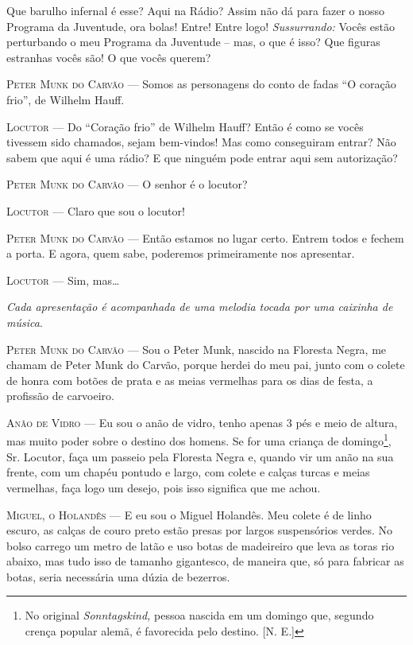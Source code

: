 Que barulho infernal é esse? Aqui na Rádio? Assim não dá para fazer o
nosso Programa da Juventude, ora bolas! Entre! Entre logo!
\emph{Sussurrando:} Vocês estão perturbando o meu Programa da Juventude
-- mas, o que é isso? Que figuras estranhas vocês são! O que vocês
querem?

\textsc{Peter Munk do Carvão} --- Somos as personagens do conto de fadas ``O
coração frio'', de Wilhelm Hauff.

\textsc{Locutor} --- Do ``Coração frio'' de Wilhelm Hauff? Então é como se vocês
tivessem sido chamados, sejam bem-vindos! Mas como conseguiram entrar?
Não sabem que aqui é uma rádio? E que ninguém pode entrar aqui sem
autorização?

\textsc{Peter Munk do Carvão} --- O senhor é o locutor?

\textsc{Locutor} --- Claro que sou o locutor!

\textsc{Peter Munk do Carvão} --- Então estamos no lugar certo. Entrem todos e
fechem a porta. E agora, quem sabe, poderemos primeiramente nos
apresentar.

\textsc{Locutor} --- Sim, mas\ldots{}

\emph{Cada apresentação é acompanhada de uma melodia tocada por uma
caixinha de música}.

\textsc{Peter Munk do Carvão} --- Sou o Peter Munk, nascido na Floresta Negra, me
chamam de Peter Munk do Carvão, porque herdei do meu pai, junto com o
colete de honra com botões de prata e as meias vermelhas para os dias de
festa, a profissão de carvoeiro.

\textsc{Anão de Vidro} --- Eu sou o anão de vidro, tenho apenas 3 pés e meio de
altura, mas muito poder sobre o destino dos homens. Se for uma criança
de domingo\footnote{No original \emph{Sonntagskind,} pessoa nascida em
  um domingo que, segundo crença popular alemã, é favorecida pelo
  destino. [N. E.]}, Sr. Locutor, faça um passeio pela Floresta
Negra e, quando vir um anão na sua frente, com um chapéu pontudo e
largo, com colete e calças turcas e meias vermelhas, faça logo um
desejo, pois isso significa que me achou.

\textsc{Miguel, o Holandês} --- E eu sou o Miguel Holandês. Meu colete é de linho
escuro, as calças de couro preto estão presas por largos suspensórios
verdes. No bolso carrego um metro de latão e uso botas de madeireiro que
leva as toras rio abaixo, mas tudo isso de tamanho gigantesco, de
maneira que, só para fabricar as botas, seria necessária uma dúzia de
bezerros.

